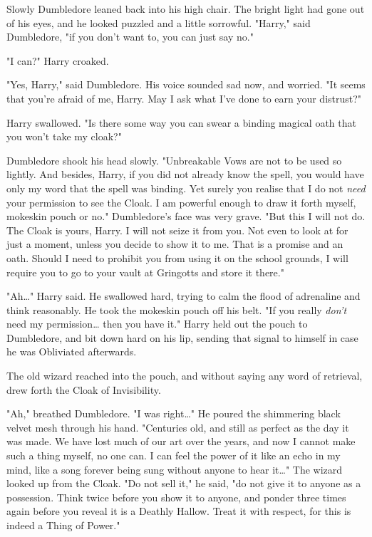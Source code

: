 Slowly Dumbledore leaned back into his high chair. The bright light had gone 
out of his eyes, and he looked puzzled and a little sorrowful. "Harry," said 
Dumbledore, "if you don't want to, you can just say no."

"I can?" Harry croaked.

"Yes, Harry," said Dumbledore. His voice sounded sad now, and worried. "It 
seems that you're afraid of me, Harry. May I ask what I've done to earn your 
distrust?"

Harry swallowed. "Is there some way you can swear a binding magical oath that 
you won't take my cloak?"

Dumbledore shook his head slowly. "Unbreakable Vows are not to be used so 
lightly. And besides, Harry, if you did not already know the spell, you would 
have only my word that the spell was binding. Yet surely you realise that I do 
not \emph{need} your permission to see the Cloak. I am powerful enough to draw 
it forth myself, mokeskin pouch or no." Dumbledore's face was very grave. "But 
this I will not do. The Cloak is yours, Harry. I will not seize it from you. 
Not even to look at for just a moment, unless you decide to show it to me. That 
is a promise and an oath. Should I need to prohibit you from using it on the 
school grounds, I will require you to go to your vault at Gringotts and store 
it there."

"Ah{\ldots}" Harry said. He swallowed hard, trying to calm the flood of 
adrenaline and think reasonably. He took the mokeskin pouch off his belt. "If 
you really \emph{don't} need my permission{\ldots} then you have it." Harry 
held out the pouch to Dumbledore, and bit down hard on his lip, sending that 
signal to himself in case he was Obliviated afterwards.

The old wizard reached into the pouch, and without saying any word of 
retrieval, drew forth the Cloak of Invisibility.

"Ah," breathed Dumbledore. "I was right{\ldots}" He poured the shimmering black 
velvet mesh through his hand. "Centuries old, and still as perfect as the day 
it was made. We have lost much of our art over the years, and now I cannot make 
such a thing myself, no one can. I can feel the power of it like an echo in my 
mind, like a song forever being sung without anyone to hear it{\ldots}" The 
wizard looked up from the Cloak. "Do not sell it," he said, "do not give it to 
anyone as a possession. Think twice before you show it to anyone, and ponder 
three times again before you reveal it is a Deathly Hallow. Treat it with 
respect, for this is indeed a Thing of Power."

